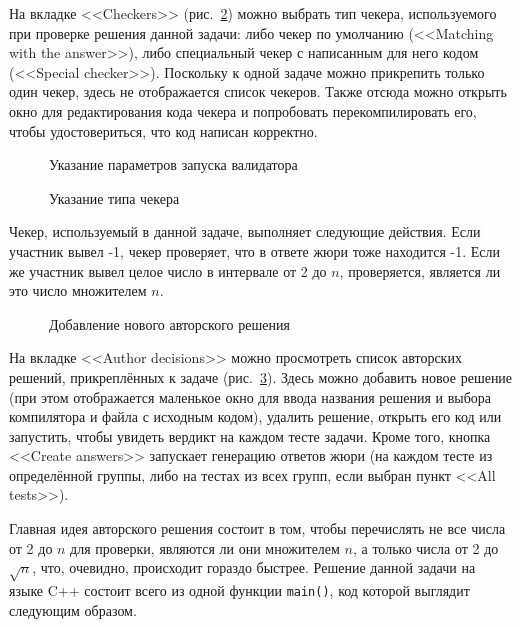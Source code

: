 На вкладке <<Checkers>> (рис.~\ref{screen_checkers}) можно выбрать тип чекера, используемого при проверке решения данной задачи: либо чекер по умолчанию (<<Matching with the answer>>), либо специальный чекер с написанным для него кодом (<<Special checker>>). Поскольку к одной задаче можно прикрепить только один чекер, здесь не отображается список чекеров. Также отсюда можно открыть окно для редактирования кода чекера и попробовать перекомпилировать его, чтобы удостовериться, что код написан корректно.

\begin{figure}[h]
\caption{Указание параметров запуска валидатора}
\label{screen_validators}
\end{figure}

\begin{figure}[h]
\caption{Указание типа чекера}
\label{screen_checkers}
\end{figure}

Чекер, используемый в данной задаче, выполняет следующие действия. Если участник вывел -1, чекер проверяет, что в ответе жюри тоже находится -1. Если же участник вывел целое число в интервале от 2 до $n$, проверяется, является ли это число множителем $n$.

\begin{figure}[!ht]
\caption{Добавление нового авторского решения}
\label{screen_author_decisions}
\end{figure}

На вкладке <<Author decisions>> можно просмотреть список авторских решений, прикреплённых к задаче (рис.~\ref{screen_author_decisions}). Здесь можно добавить новое решение (при этом отображается маленькое окно для ввода названия решения и выбора компилятора и файла с исходным кодом), удалить решение, открыть его код или запустить, чтобы увидеть вердикт на каждом тесте задачи. Кроме того, кнопка <<Create answers>> запускает генерацию ответов жюри (на каждом тесте из определённой группы, либо на тестах из всех групп, если выбран пункт <<All tests>>).

Главная идея авторского решения состоит в том, чтобы перечислять не все числа от 2 до $n$ для проверки, являются ли они множителем $n$, а только числа от 2 до $\sqrt{n}$, что, очевидно, происходит гораздо быстрее. Решение данной задачи на языке C++ состоит всего из одной функции \texttt{main()}, код которой выглядит следующим образом.

